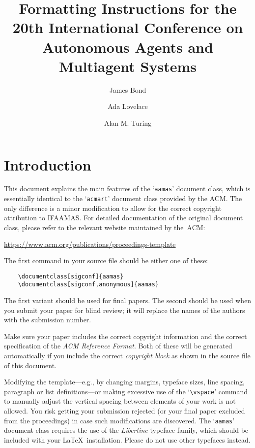 \documentclass[sigconf]{aamas}
\title[AAMAS-2021 Formatting Instructions]{Formatting Instructions for the 20th International Conference on Autonomous Agents and Multiagent Systems}
\author{James Bond}
\affiliation{
  \institution{Secret Intelligence Service}
  \city{Vauxhall, London}}
\author{Ada Lovelace}
\affiliation{
  \institution{Analytical Engines, Inc.}
  \city{Ockham Park}
  \state{Surrey}}
\author{Alan M. Turing}
\affiliation{
  \department{Computing Machine Laboratory}
  \institution{Victoria University of Manchester}}
\begin{document}

\pagestyle{fancy}
\fancyhead{}


\maketitle 


\section{Introduction}

This document explains the main features of the `\texttt{aamas}' 
document class, which is essentially identical to the `\texttt{acmart}'
document class provided by the ACM. The only difference is a minor 
modification to allow for the correct copyright attribution to IFAAMAS.
For detailed documentation of the original document class, please refer
to the relevant website maintained by the~ACM:
%
\begin{center}
\url{https://www.acm.org/publications/proceedings-template}
\end{center}
%
The first command in your source file should be either one of these:
\begin{verbatim}
    \documentclass[sigconf]{aamas}
    \documentclass[sigconf,anonymous]{aamas}
\end{verbatim}
%
The first variant should be used for final papers. The second should be
used when you submit your paper for blind review; it will replace the 
names of the authors with the submission number.

Make sure your paper includes the correct copyright information and 
the correct specification of the \emph{ACM Reference Format}. Both of 
these will be generated automatically if you include the correct 
\emph{copyright block} as shown in the source file of this document.

Modifying the template---e.g., by changing margins, typeface sizes, 
line spacing, paragraph or list definitions---or making excessive use 
of the `\verb|\vspace|' command to manually adjust the vertical spacing 
between elements of your work is not allowed. You risk getting your 
submission rejected (or your final paper excluded from the proceedings) 
in case such modifications are discovered. The `\texttt{aamas}' document 
class requires the use of the \textit{Libertine} typeface family, which 
should be included with your \LaTeX\ installation. Please do not use 
other typefaces instead.
\end{document}
